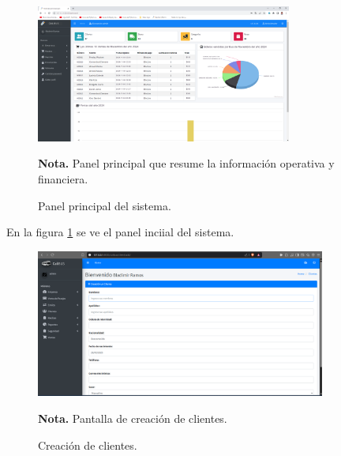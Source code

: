  
 \begin{figure}[!h] %
 	\caption[Panel principal del sistema]
 	{\newline Panel principal del sistema.} %
 	\centering
 	\includegraphics[width=0.75\textwidth]{imagenes/cap_3/Img_calibus/CALIBUS02.png} %
 	
 	\begin{flushleft}
 		\hspace{1.20cm} \textbf{Nota.} Panel principal que resume la información operativa y financiera. %
 	\end{flushleft}
 	\vspace{-16pt}
 	\label{fig:cali02} %
 \end{figure}
 
 \vspace{-0.6cm} %
 
 En la figura \ref{fig:cali02} se ve el panel inciial del sistema.
 
 \vspace{0.3cm} %
 
 \begin{figure}[!h] %
 	\caption[Creación de clientes]
 	{\newline Creación de clientes.} %
 	\centering
 	\includegraphics[width=0.85\textwidth]{imagenes/cap_3/Img_calibus/CALIBUS111.png} %
 	
 	\begin{flushleft}
 		\hspace{1.20cm} \textbf{Nota.} Pantalla de creación de clientes. %
 	\end{flushleft}
 	\vspace{-16pt}
 	\label{fig:cali08} %
 \end{figure}
 
